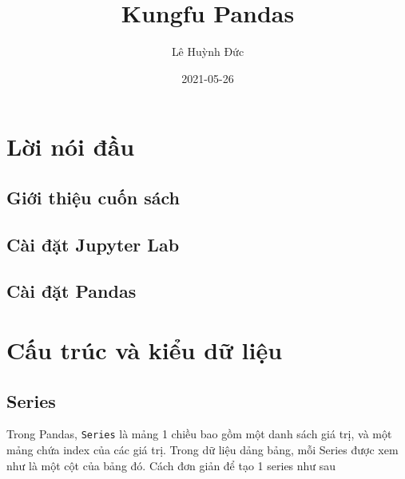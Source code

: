 \documentclass[
]{book}
\title{Kungfu Pandas}
\author{Lê Huỳnh Đức}
\date{2021-05-26}
\begin{document}
\maketitle

{
\setcounter{tocdepth}{1}
\tableofcontents
}
\hypertarget{lux1eddi-nuxf3i-ux111ux1ea7u}{%
\chapter*{Lời nói đầu}\label{lux1eddi-nuxf3i-ux111ux1ea7u}}

\hypertarget{giux1edbi-thiux1ec7u-cuux1ed1n-suxe1ch}{%
\section*{Giới thiệu cuốn sách}\label{giux1edbi-thiux1ec7u-cuux1ed1n-suxe1ch}}

\hypertarget{cuxe0i-ux111ux1eb7t-jupyter-lab}{%
\section*{Cài đặt Jupyter Lab}\label{cuxe0i-ux111ux1eb7t-jupyter-lab}}

\hypertarget{cuxe0i-ux111ux1eb7t-pandas}{%
\section*{Cài đặt Pandas}\label{cuxe0i-ux111ux1eb7t-pandas}}

\hypertarget{cux1ea5u-truxfac-vuxe0-kiux1ec3u-dux1eef-liux1ec7u}{%
\chapter{Cấu trúc và kiểu dữ liệu}\label{cux1ea5u-truxfac-vuxe0-kiux1ec3u-dux1eef-liux1ec7u}}

\hypertarget{series}{%
\section{Series}\label{series}}

Trong Pandas, \texttt{Series} là mảng 1 chiều bao gồm một danh sách giá trị, và một mảng chứa index
của các giá trị. Trong dữ liệu dảng bảng, mỗi Series được xem như là một cột của bảng đó.
Cách đơn giản để tạo 1 series như sau
\end{document}
